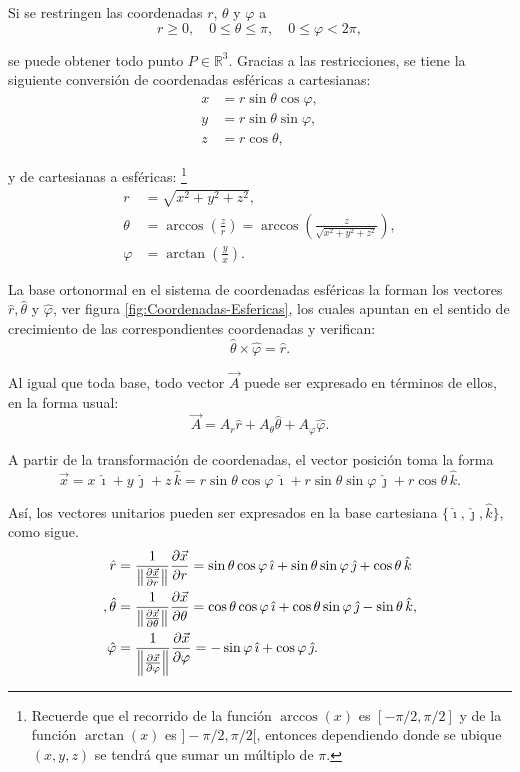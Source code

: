 Si se restringen las coordenadas $r$, $\theta$ y $\varphi$ a
$$r \geq 0, \quad 0 \leq \theta \leq \pi, \quad 0 \leq \varphi < 2\pi,$$

se puede obtener todo punto $P \in \mathbb{R}^3$. Gracias a las restricciones, se tiene la siguiente conversión de coordenadas esféricas a cartesianas:
\begin{align*}
    x &= r \sin \theta \cos \varphi,\\
    y &= r \sin \theta \sin \varphi ,\\
    z &= r \cos \theta,
\end{align*}

y de cartesianas a esféricas: \footnote{Recuerde que el recorrido de la función $\arccos(x)$ es $[-\pi/2, \pi/2]$ y de la función $\arctan(x)$ es $]-\pi/2, \pi/2[$, entonces dependiendo donde se ubique $(x,y,z)$ se tendrá que sumar un múltiplo de $\pi$.}
\begin{align*}
    r &= \sqrt{x^2+y^2+z^2}, \\
    \theta &= \arccos \left(\frac{z}{r} \right) = \arccos \left( \frac{z}{\sqrt{x^2+y^2+z^2}} \right), \\
    \varphi &= \arctan \left( \frac{y}{x} \right).
\end{align*}

La base ortonormal en el sistema de coordenadas esféricas la forman los vectores $\hat{r}, \hat{\theta}$ y $\hat{\varphi}$, ver figura \ref{fig:Coordenadas-Esfericas}, los cuales apuntan en el sentido de crecimiento de las correspondientes coordenadas y verifican:
$$\hat{\theta} \times \hat{\varphi} = \hat{r}.$$

Al igual que toda base, todo vector $\Vec{A}$ puede ser expresado en términos de ellos, en la forma usual:
$$\Vec{A} = A_r \hat{r} + A_{\theta} \hat{\theta} + A_{\varphi} \hat{\varphi}.$$

A partir de la transformación de coordenadas, el vector posición toma la forma
$$\Vec{x} = x \,\hat{\imath} + y \,\hat{\jmath} + z \,\hat{k} = r \sin \theta \cos \varphi \,\hat{\imath} + r \sin \theta \sin \varphi \,\hat{\jmath} + r \cos\theta \,\hat{k}.$$

Así, los vectores unitarios pueden ser expresados en la base cartesiana $\{\hat{\imath}, \hat{\jmath}, \hat{k}\}$, como sigue.
\begin{align*}
    \hat{r} &= \frac{1}{\left\lVert\frac{\partial \Vec{x}}{\partial r}\right\rVert}\frac{\partial \Vec{x}}{\partial r} = \sin \theta \cos \varphi \,\hat{\imath} + \sin \theta \sin \varphi \,\hat{\jmath} + \cos \theta \,\hat{k} \\,
    \hat{\theta} &= \frac{1}{\left\lVert\frac{\partial \Vec{x}}{\partial \theta}\right\rVert}\frac{\partial \Vec{x}}{\partial \theta} = \cos \theta \cos \varphi \,\hat{\imath} + \cos \theta \sin \varphi \,\hat{\jmath} - \sin \theta   \,\hat{k},  \\
    \hat{\varphi} &= \frac{1}{\left\lVert\frac{\partial \Vec{x}}{\partial \varphi}\right\rVert}\frac{\partial \Vec{x}}{\partial \varphi} = - \sin \varphi \,\hat{\imath} + \cos \varphi \,\hat{\jmath} .
\end{align*}


